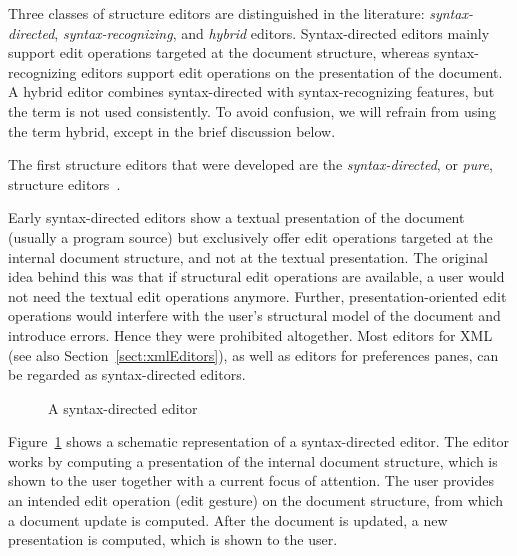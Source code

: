 Three classes of structure editors are distinguished in the literature: {\em syntax-directed}, {\em syntax-recognizing}, and {\em hybrid} editors. Syntax-directed editors mainly support edit operations targeted at the document structure, whereas syntax-recognizing editors support edit operations on the presentation of the document. A hybrid editor combines syntax-directed with syntax-recognizing features, but the term is not used consistently. To avoid confusion, we will refrain from using the term hybrid, except in the brief discussion below.


The first structure editors that were developed are the {\em syntax-directed}, or {\em pure}, structure editors~\cite{reps84synGen,Bahlke86PSG,magnusson90orm}.

Early syntax-directed editors show a textual presentation of the document (usually a program source) but exclusively offer edit operations targeted at the internal document structure, and not at the textual presentation. The original idea behind this was that if structural edit operations are available, a user would not need the textual edit operations anymore. Further, presentation-oriented edit operations would interfere with the user's structural model of the document and introduce errors. Hence they were prohibited altogether. Most editors for XML (see also Section~\ref{sect:xmlEditors}), as well as editors for preferences panes, can be regarded as syntax-directed editors.

\begin{figure}
\begin{small}
\begin{center}
\begin{center}
\begin{small}
\noindent {}
\end{small}
\end{center}\caption{A syntax-directed editor}\label{synDirEdit} 
\end{center}
\end{small}
\end{figure}


Figure~\ref{synDirEdit} shows a schematic representation of a syntax-directed editor. The editor works by computing a presentation of the internal document structure, which is shown to the user together with a current focus of attention. The user provides an intended edit operation (edit gesture) on the document structure, from which a document update is computed. After the document is updated, a new presentation is computed, which is shown to the user.

